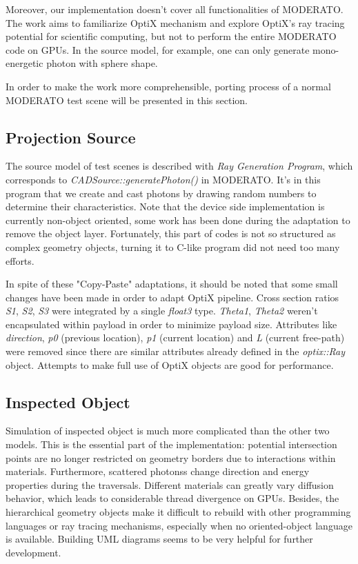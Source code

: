 Moreover, our implementation doesn't cover all functionalities of MODERATO. The work aims to familiarize OptiX mechanism and explore OptiX's ray tracing potential for scientific computing, but not to perform the entire MODERATO code on GPUs. In the source model, for example, one can only generate mono-energetic photon with sphere shape.

In order to make the work more comprehensible, porting process of a normal MODERATO test scene will be presented in this section.


\subsection{Projection Source}
The source model of test scenes is described with \textit{Ray Generation Program}, which corresponds to \textit{CADSource::generatePhoton()} in MODERATO. It's in this program that we create and cast photons by drawing random numbers to determine their characteristics. Note that the device side implementation is currently non-object oriented, some work has been done during the adaptation to remove the object layer. Fortunately, this part of codes is not so structured as complex geometry objects, turning it to C-like program did not need too many efforts.

In spite of these "Copy-Paste" adaptations, it should be noted that some small changes have been made in order to adapt OptiX pipeline. Cross section ratios \textit{S1}, \textit{S2}, \textit{S3} were integrated by a single \textit{float3} type. \textit{Theta1}, \textit{Theta2} weren't encapsulated within payload in order to minimize payload size. Attributes like \textit{direction}, \textit{p0} (previous location), \textit{p1} (current location) and \textit{L} (current free-path) were removed since there are similar attributes already defined in the \textit{optix::Ray} object. Attempts to make full use of OptiX objects are good for performance.


\subsection{Inspected Object}
Simulation of inspected object is much more complicated than the other two models. This is the essential part of the implementation: potential intersection points are no longer restricted on geometry borders due to interactions within materials. Furthermore, scattered photonss change direction and energy properties during the traversals. Different materials can greatly vary diffusion behavior, which leads to considerable thread divergence on GPUs. Besides, the hierarchical geometry objects make it difficult to rebuild with other programming languages or ray tracing mechanisms, especially when no oriented-object language is available. Building UML diagrams seems to be very helpful for further development.

